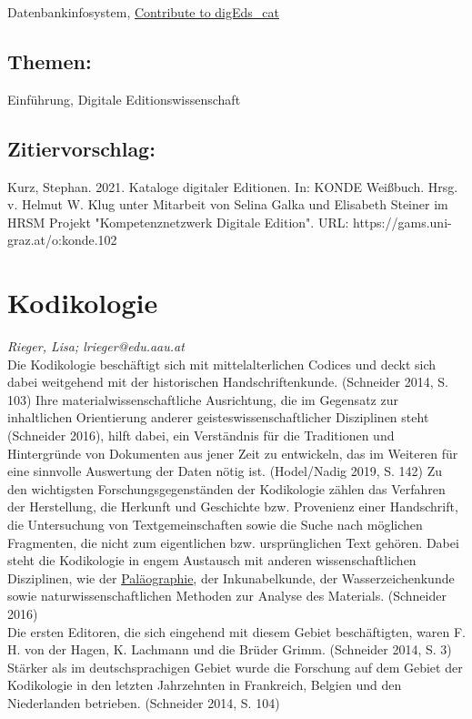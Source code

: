 \documentclass{article}
\begin{document}
{                              Datenbankinfosystem}, \href{https://github.com/gfranzini/digEds_cat/blob/master/CONTRIBUTING.md}{Contribute to digEds_cat}\subsection*{Themen:}Einführung, Digitale Editionswissenschaft\subsection*{Zitiervorschlag:}Kurz, Stephan. 2021. Kataloge digitaler Editionen. In: KONDE Weißbuch. Hrsg. v. Helmut W. Klug unter Mitarbeit von Selina Galka und Elisabeth Steiner im HRSM Projekt "Kompetenznetzwerk Digitale Edition". URL: https://gams.uni-graz.at/o:konde.102\newpage\section*{Kodikologie} \emph{Rieger, Lisa; lrieger@edu.aau.at }\\
        
    Die Kodikologie beschäftigt sich mit mittelalterlichen Codices und deckt sich dabei weitgehend mit der historischen Handschriftenkunde. (Schneider 2014, S. 103) Ihre materialwissenschaftliche Ausrichtung, die im Gegensatz zur inhaltlichen Orientierung anderer geisteswissenschaftlicher Disziplinen steht (Schneider 2016), hilft dabei, ein Verständnis für die Traditionen und Hintergründe von Dokumenten aus jener Zeit zu entwickeln, das im Weiteren für eine sinnvolle Auswertung der Daten nötig ist. (Hodel/Nadig 2019, S. 142) Zu den wichtigsten Forschungsgegenständen der Kodikologie zählen das Verfahren der Herstellung, die Herkunft und Geschichte bzw. Provenienz einer Handschrift, die Untersuchung von Textgemeinschaften sowie die Suche nach möglichen Fragmenten, die nicht zum eigentlichen bzw. ursprünglichen Text gehören. Dabei steht die Kodikologie in engem Austausch mit anderen wissenschaftlichen Disziplinen, wie der \href{http://gams.uni-graz.at/o:konde.155}{Paläographie}, der Inkunabelkunde, der Wasserzeichenkunde sowie naturwissenschaftlichen Methoden zur Analyse des Materials. (Schneider 2016)\\
            
        Die ersten Editoren, die sich eingehend mit diesem Gebiet beschäftigten, waren F. H. von der Hagen, K. Lachmann und die Brüder Grimm. (Schneider 2014, S. 3) Stärker als im deutschsprachigen Gebiet wurde die Forschung auf dem Gebiet der Kodikologie in den letzten Jahrzehnten in Frankreich, Belgien und den Niederlanden betrieben. (Schneider 2014, S. 104)\\
            
\end{document}
